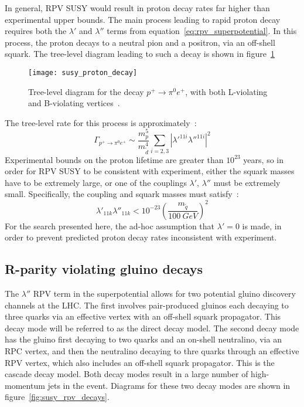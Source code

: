 In general, RPV SUSY would result in proton decay rates far higher than experimental upper bounds.
The main process leading to rapid proton decay requires both the $\lambda'$ and $\lambda''$ terms from equation~\ref{eq:rpv_superpotential}.
In this process, the proton decays to a neutral pion and a positron, via an off-shell squark.
The tree-level diagram leading to such a decay is shown in figure~\ref{fig:susy_proton_decay}
\begin{figure}[!ht]
    \centering
\texttt{[image: susy\_proton\_decay]}
\caption{Tree-level diagram for the decay $p^+ \rightarrow \pi^0 e^+$, with both L-violating and B-violating vertices~\cite{susy-primer-1998}.}
\label{fig:susy_proton_decay}
\end{figure}
The tree-level rate for this process is approximately~\cite{susy-primer-1998}:
\begin{equation}\label{eq:proton_decay_rate}
    \Gamma_{p^+ \rightarrow \pi^0 e^+} \sim \frac{m_p^5}{m_{\tilde{d}}^4} \sum_{i=2,3}\left|\lambda'^{11i}\lambda''^{11i}\right|^2
\end{equation}
Experimental bounds on the proton lifetime are greater than $10^{23}$ years,
so in order for RPV SUSY to be consistent with experiment,
either the squark masses have to be extremely large, or one of the couplings $\lambda'$, $\lambda''$ must be extremely small.
Specifically, the coupling and squark masses must satisfy~\cite{susy-rpv-constraints}:
\begin{equation}\label{eq:rpv_constraint}
    \lambda'_{11k} \lambda''_{11k} < 10^{-23} \left(\frac{m_{\tilde{q}}}{100~GeV}\right)^2
\end{equation}
For the search presented here, the ad-hoc assumption that $\lambda' = 0$ is made, in order to prevent predicted proton
decay rates inconsistent with experiment.

\subsection{R-parity violating gluino decays}\label{subsec:rpv_gluino}

The $\lambda''$ RPV term in the superpotential allows for two potential gluino discovery channels at the LHC.
The first involves pair-produced gluinos each decaying to three quarks via an effective vertex with an off-shell squark propagator.
This decay mode will be referred to as the direct decay model.
The second decay mode has the gluino first decaying to two quarks and an on-shell neutralino, via an RPC vertex, and then the neutralino decaying to thre quarks through an effective RPV vertex, which also includes an off-shell squark propagator.
This is the cascade decay model.
Both decay modes result in a large number of high-momentum jets in the event.
Diagrams for these two decay modes are shown in figure~\ref{fig:susy_rpv_decays}.

